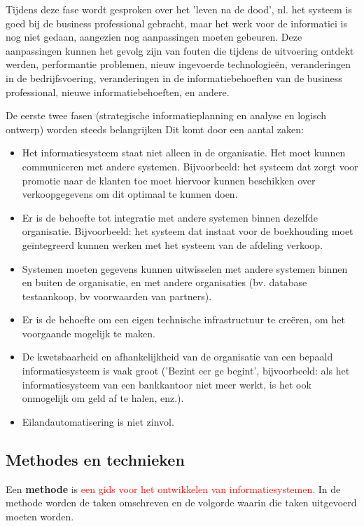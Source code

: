Tijdens deze fase wordt gesproken over het 'leven na de dood’, nl. het systeem is goed bij de business professional gebracht, maar het werk voor de informatici is nog niet gedaan, aangezien nog aanpassingen moeten gebeuren. Deze aanpassingen kunnen het gevolg zijn van fouten die tijdens de uitvoering ontdekt werden, performantie problemen, nieuw ingevoerde technologieën, veranderingen in de bedrijfsvoering, veranderingen in de informatiebehoeften van de business professional, nieuwe informatiebehoeften, en andere.


De eerste twee fasen (strategische informatieplanning en analyse en logisch ontwerp) worden steeds belangrijken Dit komt door een aantal zaken:

\begin{itemize}
    \item Het informatiesysteem staat niet alleen in de organisatie. Het moet kunnen communiceren met andere systemen. Bijvoorbeeld: het systeem dat zorgt voor promotie naar de klanten toe moet hiervoor kunnen beschikken over verkoopgegevens om dit optimaal te kunnen doen.
    \item Er is de behoefte tot integratie met andere systemen binnen dezelfde organisatie. Bijvoorbeeld: het systeem dat instaat voor de boekhouding moet geïntegreerd kunnen werken met het systeem van de afdeling verkoop.
    \item Systemen moeten gegevens kunnen uitwisselen met andere systemen binnen en buiten de organisatie, en met andere organisaties (bv. database testaankoop, bv voorwaarden van partners).
    \item Er is de behoefte om een eigen technische infrastructuur te creëren, om het voorgaande mogelijk te maken.
    \item De kwetsbaarheid en afhankelijkheid van de organisatie van een bepaald informatiesysteem is vaak groot ('Bezint eer ge begint', bijvoorbeeld: als het informatiesysteem van een bankkantoor niet meer werkt, is het ook onmogelijk om geld af te halen, enz.).
    \item Eilandautomatisering is niet zinvol.
\end{itemize}

\subsection{Methodes en technieken}

Een \textbf{methode} is \textcolor{red}{een gids voor het ontwikkelen van informatiesystemen.} In de methode worden de taken omschreven en de volgorde waarin die taken uitgevoerd moeten worden. 

